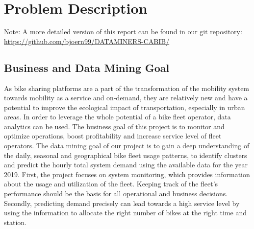 \clearpage
\section{Problem Description}
\label{sec:ProblemDescription}

Note: A more detailed version of this report can be found in our git repository: \\ \url{https://github.com/bjoern99/DATAMINERS-CABIB/}

\subsection{Business and Data Mining Goal }
\label{subsec:BusinessGoal}

As bike sharing platforms are a part of the transformation of the mobility system towards mobility as a service and on-demand, they are relatively new and have a potential to improve the ecological impact of transportation, especially in urban areas. In order to leverage the whole potential of a bike fleet operator, data analytics can be used. The business goal of this project is to monitor and optimize operations, boost profitability and increase service level of fleet operators. The data mining goal of our project is to gain a deep understanding of the daily, seasonal and geographical bike fleet usage patterns, to identify clusters and predict the hourly total system demand using the available data for the year 2019. First, the project focuses on system monitoring, which provides information about the usage and utilization of the fleet. Keeping track of the fleet’s performance should be the basis for all operational and business decisions. Secondly, predicting demand precisely can lead towards a high service level by using the information to allocate the right number of bikes at the right time and station.



